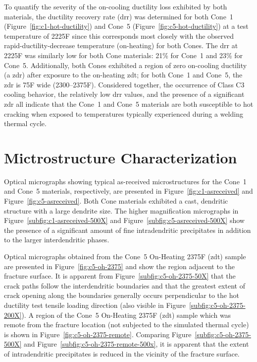 To quantify the severity of the on-cooling ductility loss exhibited by both materials, the ductility recovery rate (\gls{drr}) was determined for both Cone~1 (Figure~\ref{fig:c1-hot-ductility}) and Cone~5 (Figure~\ref{fig:c5-hot-ductility}) at a test temperature of 2225\textdegree{}F since this corresponds most closely with the observed rapid-ductility-decrease temperature (on-heating) for both Cones.  The \gls{drr} at 2225\textdegree{}F was similarly low for both Cone materials: 21\% for Cone~1 and 23\% for Cone~5.  Additionally, both Cones exhibited a region of zero on-cooling ductility (a \gls{zdr}) after exposure to the on-heating \gls{zdt}; for both Cone~1 and Cone~5, the \gls{zdr} is 75F\textdegree{} wide (2300–2375\textdegree{}F).  Considered together, the occurrence of Class C3 cooling behavior, the relatively low \gls{drr} values, and the presence of a significant \gls{zdr} all indicate that the Cone~1 and Cone~5 materials are both susceptible to hot cracking when exposed to temperatures typically experienced during a welding thermal cycle.



\section{Mictrostructure Characterization}
Optical micrographs showing typical as-received microstructures for the Cone~1 and Cone~5 materials, respectively, are presented in Figure~\ref{fig:c1-asreceived} and Figure~\ref{fig:c5-asreceived}.  Both Cone materials exhibited a cast, dendritic structure with a large dendrite size.  The higher magnification micrographs in Figure~\ref{subfig:c1-asreceived-500X} and Figure~\ref{subfig:c5-asreceived-500X} show the presence of a significant amount of fine intradendritic precipitates in addition to the larger interdendritic phases.

Optical micrographs obtained from the Cone~5 On-Heating 2375\textdegree{}F (\gls{zdt}) sample are presented in Figure~\ref{fig:c5-oh-2375} and show the region adjacent to the fracture surface.  It is apparent from Figure~\ref{subfig:c5-oh-2375-50X} that the crack paths follow the interdendritic boundaries and that the greatest extent of crack opening along the boundaries generally occurs perpendicular to the hot ductility test tensile loading direction (also visible in Figure~\ref{subfig:c5-oh-2375-200X}).  A region of the Cone~5 On-Heating 2375\textdegree{}F (\gls{zdt}) sample which was remote from the fracture location (not subjected to the simulated thermal cycle) is shown in Figure~\ref{fig:c5-oh-2375-remote}.  Comparing Figure~\ref{subfig:c5-oh-2375-500X} and Figure~\ref{subfig:c5-oh-2375-remote-500x}, it is apparent that the extent of intradendritic precipitates is reduced in the vicinity of the fracture surface.


